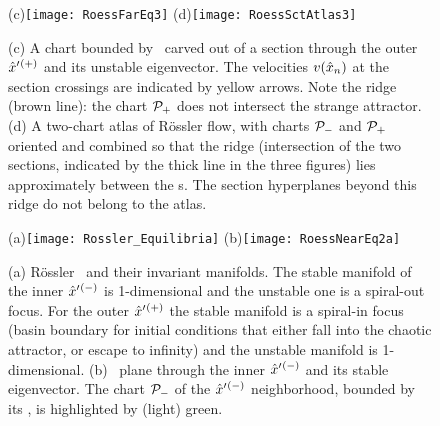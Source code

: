 \begin{figure}%
\begin{center}
(c)\texttt{[image: RoessFarEq3]}%
(d)\texttt{[image: RoessSctAtlas3]}
\end{center}
  \caption[R\"ossler section, outer {\eqv}]{
(c)
  A chart bounded by \chartBord\ carved out of a section through the
  outer {\eqv} ${\hat{x}'}{}^{(+)}$  and its unstable eigenvector. The
  velocities $v(\hat{x}_n)$ at the section crossings are indicated by
  yellow arrows. Note the ridge (brown line): the chart ${\cal P}_{+}$
  does not intersect the strange attractor.
(d)
  A two-chart atlas of R\"ossler flow, with charts ${\cal P}_{-}$ and
  ${\cal P}_{+}$ oriented and combined so that the ridge (intersection of
  the two sections, indicated by the thick line in the three figures)
  lies approximately between the \template s. The section hyperplanes
  beyond this ridge do not belong to the atlas.
  } \label{fig:RoessFarEq3}
\end{figure}

\begin{figure}
(a)\texttt{[image: Rossler\_Equilibria]}%
(b)\texttt{[image: RoessNearEq2a]}
    \caption{
(a)
R\"ossler \eqva\ and their invariant manifolds. The stable manifold of
the inner {\eqv} ${\hat{x}'}{}^{(-)}$  is 1-dimensional and the unstable one
is a spiral-out focus. For the outer {\eqv} ${\hat{x}'}{}^{(+)}$  the stable
manifold is a spiral-in focus (basin boundary for initial conditions that
either fall into the chaotic attractor, or escape to infinity) and the
unstable manifold is 1-dimensional.
(b)
\PoincSec\ plane through the inner {\eqv} ${\hat{x}'}{}^{(-)}$ and
its stable eigenvector. The chart ${\cal P}_{-}$ of the ${\hat{x}'}{}^{(-)}$
neighborhood, bounded by its \poincBord, is highlighted by (light) green.
    }
\label{fig:RoessTrjs2}
\end{figure}

